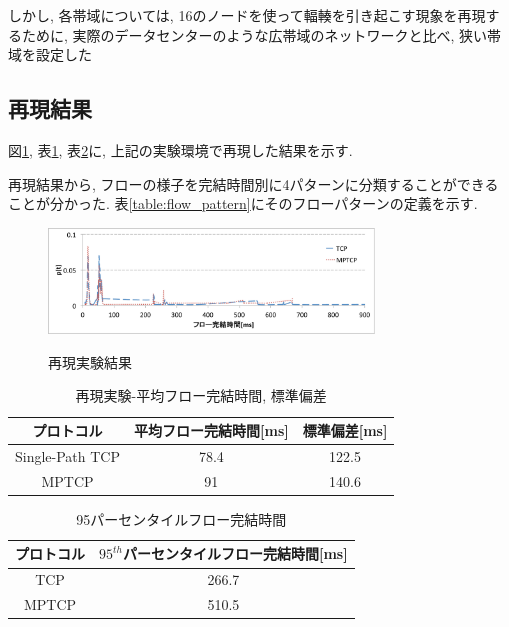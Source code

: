 \documentclass[technicalreport]{ieicej}
\begin{document}
しかし, 各帯域については, 16のノードを使って輻輳を引き起こす現象を再現するために, 実際のデータセンターのような広帯域のネットワークと比べ,
狭い帯域を設定した

\subsection{再現結果}
図\ref{fig:short_flow_rep}, 表\ref{table:short_flow_rep},
表\ref{table:percentile}に, 上記の実験環境で再現した結果を示す.

再現結果から, フローの様子を完結時間別に4パターンに分類することができることが分かった.
表\ref{table:flow_pattern}にそのフローパターンの定義を示す.

\begin{figure}[h]
    \begin{center}
    \includegraphics[autoebb, width=245pt]{./img/flow_comp.pdf}
    \caption{再現実験結果}
    \label{fig:short_flow_rep}
    \end{center}
\end{figure}

\begin{table}[h]
\begin{center}
\begin{tabular}{c|c|c}
\hline
プロトコル & 平均フロー完結時間[ms] & 標準偏差[ms]\\ \hline \hline
Single-Path TCP & 78.4 & 122.5 \\
MPTCP & 91 & 140.6\\
\hline
\end{tabular}
\caption{再現実験-平均フロー完結時間, 標準偏差}
\label{table:short_flow_rep}
\end{center}
\end{table}

\begin{table}[h]
\begin{center}
\begin{tabular}{c|c}
\hline
プロトコル & $95^{th}$パーセンタイルフロー完結時間[ms] \\ \hline \hline
TCP & 266.7 \\
MPTCP & 510.5 \\
\hline
\end{tabular}
\caption{95パーセンタイルフロー完結時間}
\label{table:percentile}
\end{center}
\end{table}
\end{document}
